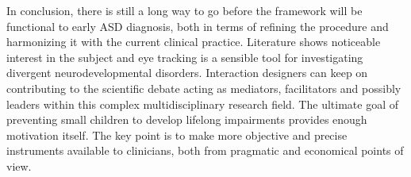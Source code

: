 In conclusion, there is still a long way to go before the framework will be functional to early ASD diagnosis, both in terms of refining the procedure and harmonizing it with the current clinical practice. Literature shows noticeable interest in the subject and eye tracking is a sensible tool for investigating divergent neurodevelopmental disorders. Interaction designers can keep on contributing to the scientific debate acting as mediators, facilitators and possibly leaders within this complex multidisciplinary research field. The ultimate goal of preventing small children to develop lifelong impairments provides enough motivation itself. The key point is to make more objective and precise instruments available to clinicians, both from pragmatic and economical points of view.
